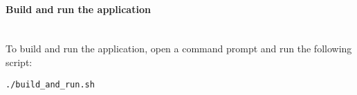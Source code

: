 \paragraph{Build and run the application}
\mbox{}\\
To build and run the application, open a command prompt and run the following script:

\begin{lstlisting}[numbers=none, caption={Script to Build and Run the URL-Archiver Application on Linux and macOS}, label={lst:build_run_unix}]
./build_and_run.sh
\end{lstlisting}